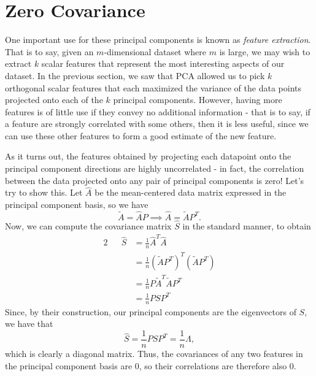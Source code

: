 \documentclass[letterpaper]{article}
\theoremstyle{remark}
\renewcommand{\tilde}[1]{\widetilde{#1}}
\newcommand{\eqn}[1]{\begin{alignat*}{2}#1\end{alignat*}}
\begin{document}
\section{Zero Covariance}
One important use for these principal components is known as \emph{feature extraction}. That is to say, given an $m$-dimensional dataset where $m$ is large, we may wish to extract $k$ scalar features that represent the most interesting aspects of our dataset. In the previous section, we saw that PCA allowed us to pick $k$ orthogonal scalar features that each maximized the variance of the data points projected onto each of the $k$ principal components. However, having more features is of little use if they convey no additional information - that is to say, if a feature are strongly correlated with some others, then it is less useful, since we can use these other features to form a good estimate of the new feature.

As it turns out, the features obtained by projecting each datapoint onto the principal component directions are highly uncorrelated - in fact, the correlation between the data projected onto any pair of principal components is zero! Let's try to show this. Let $\hat{A}$ be the mean-centered data matrix expressed in the principal component basis, so we have
\[
     \tilde{A} = \hat{A}P \implies \hat{A} = \tilde{A}P^T.
\]
Now, we can compute the covariance matrix $\hat{S}$ in the standard manner, to obtain
\eqn{
    && \hat{S} &= \frac{1}{n} \hat{A}^T\hat{A} \\
    &&&= \frac{1}{n} (\tilde{A}P^T)^T(\tilde{A}P^T) \\
    &&&= \frac{1}{n} P\tilde{A}^T\tilde{A}P^T \\
    &&&= \frac{1}{n} PSP^T
}
Since, by their construction, our principal components are the eigenvectors of $S$, we have that
\[
    \hat{S} = \frac{1}{n}PSP^T = \frac{1}{n}\Lambda,
\]
which is clearly a diagonal matrix. Thus, the covariances of any two features in the principal component basis are $0$, so their correlations are therefore also $0$.
\end{document}
